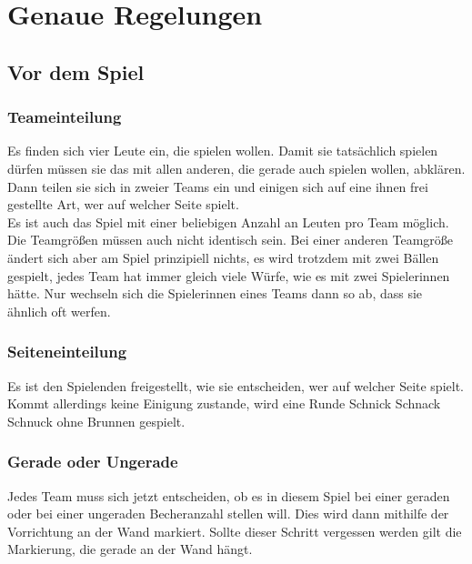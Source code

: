 \documentclass[a5paper, 12pt]{book}
\begin{document}
\section{Genaue Regelungen}\label{sec:genaue regelungen}
\subsection{Vor dem Spiel}\label{sub:vor dem spiel}
\subsubsection{Teameinteilung}\label{subsubsec:teameinteilung}
Es finden sich vier Leute ein, die spielen wollen. Damit sie tatsächlich spielen dürfen müssen sie das mit allen anderen, die gerade auch spielen wollen, abklären. Dann teilen sie sich in zweier Teams ein und einigen sich auf eine ihnen frei gestellte Art, wer auf welcher Seite spielt. \\
Es ist auch das Spiel mit einer beliebigen Anzahl an Leuten pro Team möglich. Die Teamgrößen müssen auch nicht identisch sein. Bei einer anderen Teamgröße ändert sich aber am Spiel prinzipiell nichts, es wird trotzdem mit zwei Bällen gespielt, jedes Team hat immer gleich viele Würfe, wie es mit zwei Spielerinnen hätte. Nur wechseln sich die Spielerinnen eines Teams dann so ab, dass sie ähnlich oft werfen.
\subsubsection{Seiteneinteilung}\label{subsub:seiteneinteilung}
Es ist den Spielenden freigestellt, wie sie entscheiden, wer auf welcher Seite spielt. Kommt allerdings keine Einigung zustande, wird eine Runde Schnick Schnack Schnuck ohne Brunnen gespielt.
\subsubsection{Gerade oder Ungerade}\label{subsub:geradeoderungerade}
Jedes Team muss sich jetzt entscheiden, ob es in diesem Spiel bei einer geraden oder bei einer ungeraden Becheranzahl stellen will. Dies wird dann mithilfe der Vorrichtung an der Wand markiert. Sollte dieser Schritt vergessen werden gilt die Markierung, die gerade an der Wand hängt.
\end{document}
